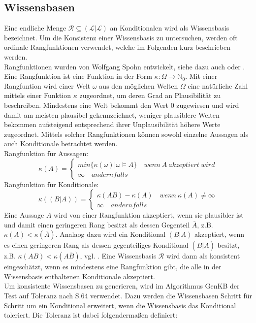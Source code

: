 \documentclass[12pt,a4paper]{article}
\newcommand{\lag}{\mathcal{L}}
\begin{document}
\subsection{Wissensbasen}
\label{sec:wissensbasen}
Eine endliche Menge $\mathcal{R} \subseteq (\lag | \lag)$ an Konditionalen wird als Wissensbasis bezeichnet. Um die Konsistenz einer Wissensbasis zu untersuchen, werden oft ordinale Rangfunktionen verwendet, welche im Folgenden kurz beschrieben werden. \\
Rangfunktionen wurden von Wolfgang Spohn entwickelt, siehe dazu auch \cite{spohn88} oder \cite{spohn12}. Eine Rangfunktion ist eine Funktion in der Form $\kappa :  \Omega \rightarrow \mathbb{N}_0 $. Mit einer Rangfuntion wird einer Welt $\omega$ aus den möglichen Welten $\Omega$ eine natürliche Zahl mittels einer Funktion $\kappa$ zugeordnet, um deren Grad an Plausibilität zu beschreiben. Mindestens eine Welt bekommt den Wert 0 zugewiesen und wird damit am meisten plausibel gekennzeichnet, weniger plausiblere Welten bekommen aufsteigend entsprechend ihrer Unplausibilität höhere Werte zugeordnet. Mittels solcher Rangfunktionen können sowohl einzelne Aussagen als auch Konditionale betrachtet werden.\\
Rangfunktion für Aussagen:
\[
 \kappa(A)=\begin{cases}
			min\{\kappa(\omega)|\omega \models A \} \quad wenn \  A \ akzeptiert \ wird \\
			\infty \quad andernfalls
            \end{cases}
\]
Rangfunktion für Konditionale:
\[
\kappa((B|A))=\begin{cases}
			\kappa(AB) - \kappa(A) \quad wenn \ \kappa(A) \neq \infty \\
			\infty \quad andernfalls
            \end{cases}
\]
Eine Aussage $A$ wird von einer Rangfunktion akzeptiert, wenn sie plausibler ist und damit einen geringeren Rang besitzt als dessen Gegenteil $\overline{A}$, z.B. $\kappa(A) < \kappa(\overline{A})$. Analaog dazu wird ein Konditional $(B|A)$ akzeptiert, wenn es einen geringeren Rang als dessen gegenteiliges Konditional $(\overline{B}|A)$ besitzt, z.B. $\kappa(AB)<\kappa(A\overline{B})$, vgl. \cite{beierle17}. Eine Wissensbasis $\mathcal{R}$ wird dann als konsistent eingeschätzt, wenn es mindestens eine Rangfunktion gibt, die alle in der Wissensbasis enthaltenen Konditionale akzeptiert.\\
Um konsistente Wissensbasen zu generieren, wird im Algorithmus GenKB der Test auf Toleranz nach \cite{goldszmidt96}S.64 verwendet. Dazu werden die Wissensbasen Schritt für Schritt um ein Konditional erweitert, wenn die Wissensbasis das Konditional toleriert. Die Toleranz ist dabei folgendermaßen definiert:
\end{document}
